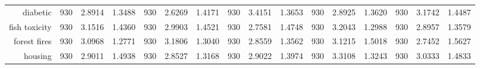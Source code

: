\begin{table}[H]
{\begin{tabular}{rccccccccccccccc}
			diabetic                            & 930                                 & 2.8914                                                                    & 1.3488          & 930                                & \cellcolor[rgb]{ .776,  .937,  .808}\textcolor[rgb]{ 0,  .38,  0}{2.6269}          & 1.4171          & 930                                & 3.4151                                                                    & 1.3653          & 930                                & 2.8925                                                                    & 1.3620          & 930                                    & 3.1742                                                                    & 1.4487          \\
			fish toxicity                       & 930                                 & 3.1516                                                                    & 1.4360          & 930                                & 2.9903                                                                             & 1.4521          & 930                                & \cellcolor[rgb]{ .776,  .937,  .808}\textcolor[rgb]{ 0,  .38,  0}{2.7581} & 1.4748          & 930                                & 3.2043                                                                    & 1.2988          & 930                                    & 2.8957                                                                    & 1.3579          \\
			forest fires                        & 930                                 & 3.0968                                                                    & 1.2771          & 930                                & 3.1806                                                                             & 1.3040          & 930                                & 2.8559                                                                    & 1.3562          & 930                                & 3.1215                                                                    & 1.5018          & 930                                    & \cellcolor[rgb]{ .776,  .937,  .808}\textcolor[rgb]{ 0,  .38,  0}{2.7452} & 1.5627          \\
			housing                             & 930                                 & 2.9011                                                                    & 1.4938          & 930                                & \cellcolor[rgb]{ .776,  .937,  .808}\textcolor[rgb]{ 0,  .38,  0}{2.8527}          & 1.3168          & 930                                & 2.9022                                                                    & 1.3974          & 930                                & 3.3108                                                                    & 1.3243          & 930                                    & 3.0333                                                                    & 1.4833          \\

\end{tabular}}
\end{table}
